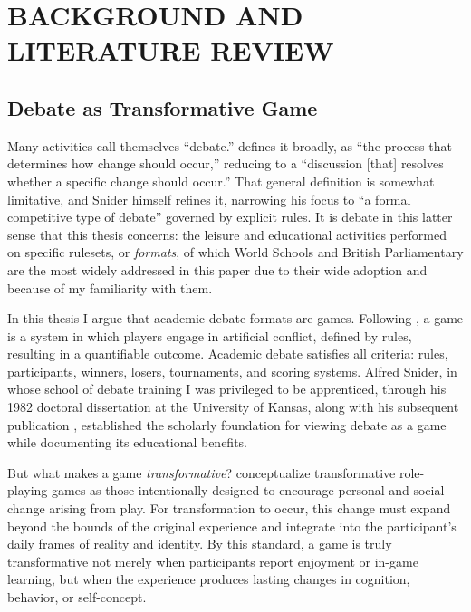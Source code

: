 \section{BACKGROUND AND LITERATURE REVIEW}
\label{sec:background}

\subsection{Debate as Transformative Game}

Many activities call themselves ``debate.'' \textcite{snider2008code} defines it broadly, as ``the process that determines how change should occur,'' reducing to a ``discussion [that] resolves whether a specific change should occur.'' That general definition is somewhat limitative, and Snider himself refines it, narrowing his focus to ``a formal competitive type of debate'' governed by explicit rules. It is debate in this latter sense that this thesis concerns: the leisure and educational activities performed on specific rulesets, or \emph{formats}, of which World Schools and British Parliamentary are the most widely addressed in this paper due to their wide adoption and because of my familiarity with them.

In this thesis I argue that academic debate formats are games. Following \textcite{salen2004rules}, a game is a system in which players engage in artificial conflict, defined by rules, resulting in a quantifiable outcome. Academic debate satisfies all criteria: rules, participants, winners, losers, tournaments, and scoring systems. Alfred Snider, in whose school of debate training I was privileged to be apprenticed, through his 1982 doctoral dissertation at the University of Kansas, along with his subsequent publication \parencite{snider1984gaming}, established the scholarly foundation for viewing debate as a game while documenting its educational benefits.

But what makes a game \textit{transformative}? \textcite{bowman2025transformative} conceptualize transformative role-playing games as those intentionally designed to encourage personal and social change arising from play. For transformation to occur, this change must expand beyond the bounds of the original experience and integrate into the participant's daily frames of reality and identity. By this standard, a game is truly transformative not merely when participants report enjoyment or in-game learning, but when the experience produces lasting changes in cognition, behavior, or self-concept.


